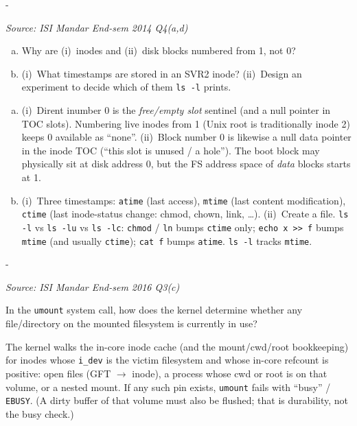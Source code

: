\documentclass[11pt,a4paper]{article}
\makeatletter
\newcommand{\keepspace}[1]{\par\penalty-100\begingroup
  \setlength{\dimen@}{#1}\dimen@ii\pagegoal\advance\dimen@ii-\pagetotal
  \ifdim\dimen@>\dimen@ii\ifdim\dimen@ii>\z@\vfil\fi\break\fi\endgroup}
\newcounter{qn}[section]
\newenvironment{Qn}[4]{%
  \refstepcounter{qn}\keepspace{7\baselineskip}%
  \begin{tcolorbox}[qboxstyle, title={Q\thesection.\theqn\ \ [#1 \textbar\ #2]\ \ #4}]%
  {\footnotesize\color{g3}\textit{Source: #3}}\par\smallskip%
}{%
  \end{tcolorbox}%
}
\newenvironment{Sol}{%
  \begin{tcolorbox}[sboxstyle, title={Solution}]%
}{%
  \end{tcolorbox}\vspace{0.35em}%
}
\makeatother
\begin{document}
\begin{Qn}{Medium}{Lect 23}{ISI Mandar End-sem 2014 Q4(a,d)}{Why inodes/blocks start at 1; what \texttt{ls -l} shows}
\begin{enumerate}[(a)]
\item Why are (i)~inodes and (ii)~disk blocks numbered from 1, not 0?
\item (i)~What timestamps are stored in an SVR2 inode?
      (ii)~Design an experiment to decide which of them \texttt{ls -l}
      prints.
\end{enumerate}
\end{Qn}
\begin{Sol}
\begin{enumerate}[(a)]
\item (i)~Dirent inumber $0$ is the \emph{free/empty slot} sentinel
      (and a null pointer in TOC slots). Numbering live inodes from 1
      (Unix root is traditionally inode 2) keeps 0 available as
      ``none''.
      (ii)~Block number 0 is likewise a null data pointer in the
      inode TOC (``this slot is unused / a hole''). The boot block
      may physically sit at disk address 0, but the FS address space
      of \emph{data} blocks starts at 1.
\item (i)~Three timestamps: \texttt{atime} (last access),
      \texttt{mtime} (last content modification), \texttt{ctime}
      (last inode-status change: chmod, chown, link, \ldots).
      (ii)~Create a file. \texttt{ls -l} vs \texttt{ls -lu} vs
      \texttt{ls -lc}:
      \texttt{chmod} / \texttt{ln} bumps \texttt{ctime} only;
      \texttt{echo x >> f} bumps \texttt{mtime} (and usually
      \texttt{ctime}); \texttt{cat f} bumps \texttt{atime}.
      \texttt{ls -l} tracks \texttt{mtime}.
\end{enumerate}
\end{Sol}

\begin{Qn}{Medium}{Lect 23}{ISI Mandar End-sem 2016 Q3(c)}{How \texttt{umount} knows the FS is busy}
In the \texttt{umount} system call, how does the kernel determine
whether any file/directory on the mounted filesystem is currently
in use?
\end{Qn}
\begin{Sol}
The kernel walks the in-core inode cache (and the mount/cwd/root
bookkeeping) for inodes whose \texttt{i\_dev} is the victim
filesystem and whose in-core refcount is positive: open files
(GFT $\to$ inode), a process whose cwd or root is on that volume,
or a nested mount. If any such pin exists, \texttt{umount} fails
with ``busy'' / \texttt{EBUSY}. (A dirty buffer of that volume
must also be flushed; that is durability, not the busy check.)
\end{Sol}
\end{document}
